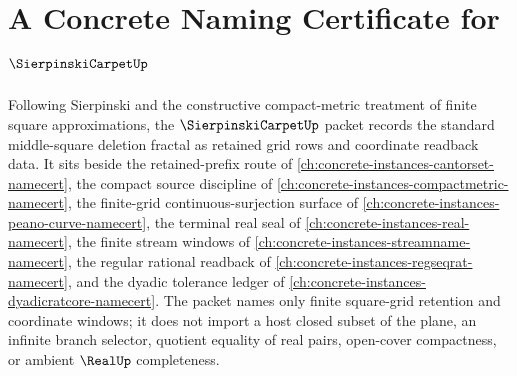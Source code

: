 \chapter{A Concrete Naming Certificate for $\SierpinskiCarpetUp$}
\label{ch:concrete-instances-sierpinski-carpet-namecert}

Following Sierpinski and the constructive compact-metric treatment of finite square approximations, the $\SierpinskiCarpetUp$ packet records the standard middle-square deletion fractal as retained grid rows and coordinate readback data. It sits beside the retained-prefix route of \autoref{ch:concrete-instances-cantorset-namecert}, the compact source discipline of \autoref{ch:concrete-instances-compactmetric-namecert}, the finite-grid continuous-surjection surface of \autoref{ch:concrete-instances-peano-curve-namecert}, the terminal real seal of \autoref{ch:concrete-instances-real-namecert}, the finite stream windows of \autoref{ch:concrete-instances-streamname-namecert}, the regular rational readback of \autoref{ch:concrete-instances-regseqrat-namecert}, and the dyadic tolerance ledger of \autoref{ch:concrete-instances-dyadicratcore-namecert}. The packet names only finite square-grid retention and coordinate windows; it does not import a host closed subset of the plane, an infinite branch selector, quotient equality of real pairs, open-cover compactness, or ambient $\RealUp$ completeness.

